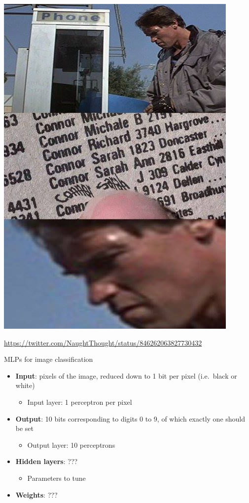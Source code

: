 \begin{frame}
	\begin{center}
		\includegraphics[height=0.8\textheight]{captcha}

		\tiny{\url{https://twitter.com/NaughtThought/status/846262063827730432}}
	\end{center}
\end{frame}

\begin{frame}{MLPs for image classification}
	\begin{itemize}
		\pause\item \textbf{Input}: pixels of the image, reduced down to 1 bit per pixel (i.e.\ black or white)
			\begin{itemize}
				\pause\item Input layer: 1 perceptron per pixel
			\end{itemize}
		\pause\item \textbf{Output}: 10 bits corresponding to digits 0 to 9, of which exactly one should be set
			\begin{itemize}
				\pause\item Output layer: 10 perceptrons
			\end{itemize}
		\pause\item \textbf{Hidden layers}: ???
			\begin{itemize}
				\pause\item Parameters to tune
			\end{itemize}
		\pause\item \textbf{Weights}: ???
	\end{itemize}
\end{frame}

